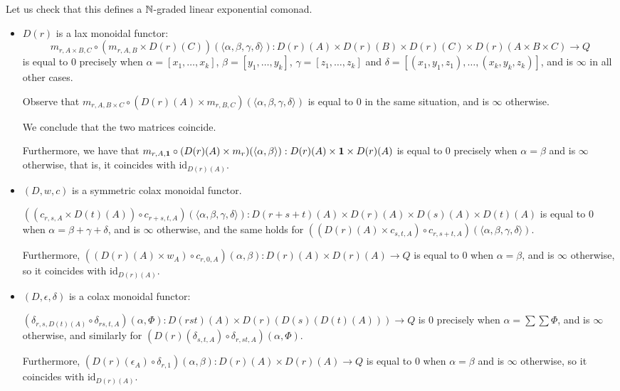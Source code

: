 Let us check that this defines a $\mathbb{N}$-graded linear exponential comonad.

\begin{itemize}

\item $D(r)$ is a lax monoidal functor:
 $$ m_{r,A\times B,C}\circ (m_{r,A,B}\times D(r)(C))(\langle \alpha,\beta,\gamma,\delta\rangle)
 :
 D(r)(A)\times D(r)(B)\times D(r)(C) \times D(r)(A\times B\times C)\to Q
 $$
 is equal to $0$ 
precisely when $\alpha=[x_{1},\dots, x_{k}]$, $\beta=[y_{1},\dots, y_{k}]$, $\gamma=[z_{1},\dots, z_{k}]$ and 
$\delta= [(x_{1},y_{1},z_{1}),\dots, (x_{k},y_{k},z_{k})]$, and is $\infty $ in all other cases.

Observe that
$m_{r,A,B\times C}\circ (D(r)(A)\times m_{r,B,C})(\langle\alpha,\beta,\gamma, \delta\rangle)
  $ is equal to $0$ in the same situation, and is $\infty$ otherwise.
 
 We conclude that the two matrices coincide.
 
 Furthermore, we have that 
 $m_{r,A,\mathbf{1}}\circ (D(r)(A)\times m_{r})(\langle \alpha,\beta\rangle): D(r)(A)\times \mathbf{1} \times D(r)(A)$ is equal to $0$ 
 precisely when $\alpha=\beta$ and is $\infty$ otherwise, that is, it coincides with $\mathrm{id}_{D(r)(A)}$. 
 


\item $(D,w,c)$ is a symmetric colax monoidal functor.


$((c_{r,s,A}\times D(t)(A))\circ c_{r+s,t,A}) (\langle \alpha,\beta,\gamma,\delta\rangle)
: D(r+s+t)(A)\times D(r)(A)\times D(s)(A)\times D(t)(A)$
is equal to $0$ when $\alpha=\beta+\gamma+\delta$, and is $\infty$ otherwise, and the same holds for
$((D(r)(A)\times c_{s,t,A})\circ c_{r,s+t,A}) (\langle \alpha,\beta,\gamma,\delta\rangle)
$.

Furthermore, 
$((D(r)(A)\times w_{A})\circ c_{r,0,A})(\alpha,\beta)
: D(r)(A)\times D(r)(A)\to Q$ is equal to $0$ when 
$\alpha=\beta$, and is $\infty$ otherwise, so it coincides with 
$\mathrm{id}_{D(r)(A)}$.

\item $(D,\epsilon,\delta)$ is a colax monoidal functor:

$(\delta_{r,s,D(t)(A)}\circ \delta_{rs,t,A})
(\alpha, \Phi)
: D(rst)(A) \times D(r)(D(s)(D(t)(A))) \to Q
$
is $0$ precisely when $\alpha = \sum \sum \Phi$, and is $\infty$ otherwise, and similarly for 
$(D(r)(\delta_{s,t,A})\circ \delta_{r,st,A})(\alpha,\Phi)$.


Furthermore, 
$(D(r)(\epsilon_{A})\circ \delta_{r,1})( \alpha,\beta ):
D(r)(A) \times D(r)(A)\to Q
$ is equal to $0$ when $\alpha=\beta$ and is $\infty$ otherwise, so it coincides with $\mathrm{id}_{D(r)(A)}$.


\end{itemize}


